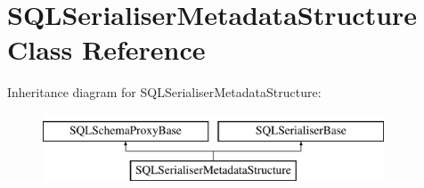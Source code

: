 \hypertarget{class_s_q_l_serialiser_metadata_structure}{}\section{S\+Q\+L\+Serialiser\+Metadata\+Structure Class Reference}
\label{class_s_q_l_serialiser_metadata_structure}
Inheritance diagram for S\+Q\+L\+Serialiser\+Metadata\+Structure\+:\begin{figure}[H]
\begin{center}
\leavevmode
\includegraphics[height=2.000000cm]{class_s_q_l_serialiser_metadata_structure}
\end{center}
\end{figure}
